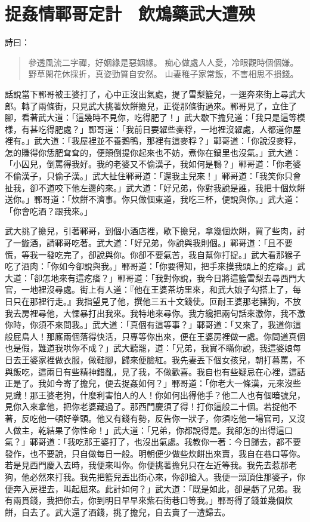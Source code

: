 
\chapter{捉姦情鄆哥定計　飲鴆藥武大遭殃}

詩曰：
\begin{quote}
參透風流二字禪，好姻緣是惡姻緣。
痴心做處人人愛，冷眼觀時個個嫌。
野草閑花休採折，真姿勁質自安然。
山妻稚子家常飯，不害相思不損錢。
\end{quote}

話說當下鄆哥被王婆打了，心中正沒出氣處，提了雪梨籃兒，一逕奔來街上尋武大郎。轉了兩條街，只見武大挑著炊餅擔兒，正從那條街過來。鄆哥見了，立住了腳，看著武大道：「這幾時不見你，吃得肥了！」武大歇下擔兒道：「我只是這等模樣，有甚吃得肥處？」鄆哥道：「我前日要糴些麥稃，一地裡沒糴處，人都道你屋裡有。」武大道：「我屋裡並不養鵝鴨，那裡有這麥稃？」鄆哥道：「你說沒麥稃，怎的賺得你恁肥耷耷的，便顛倒提你起來也不妨，煮你在鍋里也沒氣。」武大道：「小囚兒，倒罵得我好。我的老婆又不偷漢子，我如何是鴨？」鄆哥道：「你老婆不偷漢子，只偷子漢。」武大扯住鄆哥道：「還我主兒來！」鄆哥道：「我笑你只會扯我，卻不道咬下他左邊的來。」武大道：「好兄弟，你對我說是誰，我把十個炊餅送你。」鄆哥道：「炊餅不濟事。你只做個東道，我吃三杯，便說與你。」武大道：「你會吃酒？跟我來。」

武大挑了擔兒，引著鄆哥，到個小酒店裡，歇下擔兒，拿幾個炊餅，買了些肉，討了一鏇酒，請鄆哥吃著。武大道：「好兄弟，你說與我則個。」鄆哥道：「且不要慌，等我一發吃完了，卻說與你。你卻不要氣苦，我自幫你打捉。」武大看那猴子吃了酒肉：「你如今卻說與我。」鄆哥道：「你要得知，把手來摸我頭上的疙瘩。」武大道：「卻怎地來有這疙瘩？」鄆哥道：「我對你說，我今日將這籃雪梨去尋西門大官，一地裡沒尋處。街上有人道：『他在王婆茶坊里來，和武大娘子勾搭上了，每日只在那裡行走。』我指望見了他，撰他三五十文錢使。叵耐王婆那老豬狗，不放我去房裡尋他，大慄暴打出我來。我特地來尋你。我方纔把兩句話來激你，我不激你時，你須不來問我。」武大道：「真個有這等事？」鄆哥道：「又來了，我道你這般屁鳥人！那廝兩個落得快活，只專等你出來，便在王婆房裡做一處。你問道真個也是假，難道我哄你不成？」武大聽罷，道：「兄弟，我實不瞞你說，我這婆娘每日去王婆家裡做衣服，做鞋腳，歸來便臉紅。我先妻丟下個女孩兒，朝打暮罵，不與飯吃，這兩日有些精神錯亂，見了我，不做歡喜。我自也有些疑忌在心裡，這話正是了。我如今寄了擔兒，便去捉姦如何？」鄆哥道：「你老大一條漢，元來沒些見識！那王婆老狗，什麼利害怕人的人！你如何出得他手？他二人也有個暗號兒，見你入來拿他，把你老婆藏過了。那西門慶須了得！打你這般二十個。若捉他不著，反吃他一頓好拳頭。他又有錢有勢，反告你一狀子，你須吃他一場官司，又沒人做主，乾結果了你性命！」武大道：「兄弟，你都說得是。我卻怎的出得這口氣？」鄆哥道：「我吃那王婆打了，也沒出氣處。我教你一著：今日歸去，都不要發作，也不要說，只自做每日一般。明朝便少做些炊餅出來賣，我自在巷口等你。若是見西門慶入去時，我便來叫你。你便挑著擔兒只在左近等我。我先去惹那老狗，他必然來打我。我先把籃兒丟出街心來，你卻搶入。我便一頭頂住那婆子，你便奔入房裡去，叫起屈來。此計如何？」武大道：「既是如此，卻是虧了兄弟。我有兩貫錢，我把你去，你到明日早早來紫石街巷口等我。」鄆哥得了錢並幾個炊餅，自去了。武大還了酒錢，挑了擔兒，自去賣了一遭歸去。

